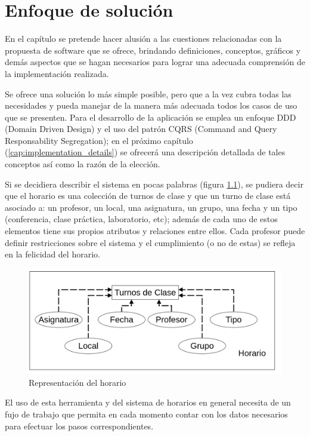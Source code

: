 \chapter{Enfoque de solución}

En el capítulo se pretende hacer alusión a las cuestiones relacionadas con la propuesta de software que se ofrece, brindando definiciones, conceptos, gráficos y demás aspectos que se hagan necesarios para lograr una adecuada comprensión de la implementación realizada.

Se ofrece una solución lo más simple posible, pero que a la vez cubra todas las necesidades y pueda manejar de la manera más adecuada todos los casos de uso que se presenten. Para el desarrollo de la aplicación se emplea un enfoque DDD (Domain Driven Design) y el uso del patrón CQRS (Command and Query Responsability Segregation); en el próximo capítulo (\ref{cap:implementation_details}) se ofrecerá una descripción detallada de tales conceptos así como la razón de la elección.

Si se decidiera describir el sistema en pocas palabras (figura \ref{fig:horario}), se pudiera decir que el horario es una colección de turnos de clase y que un turno de clase está asociado a: un profesor, un local, una asignatura, un grupo, una fecha y un tipo (conferencia, clase práctica, laboratorio, etc); además de cada uno de estos elementos tiene sus propios atributos y relaciones entre ellos. Cada profesor puede definir restricciones sobre el sistema y el cumplimiento (o no de estas) se refleja en la felicidad del horario.

\begin{figure}[h!]
	\centering
	\includegraphics[width=1\linewidth]{images/Chapter 2/horario}
	\caption{Representación del horario}
	\label{fig:horario}
\end{figure}

El uso de esta herramienta y del sistema de horarios en general necesita de un fujo de trabajo que permita en cada momento contar con los datos necesarios para efectuar los pasos correspondientes.

